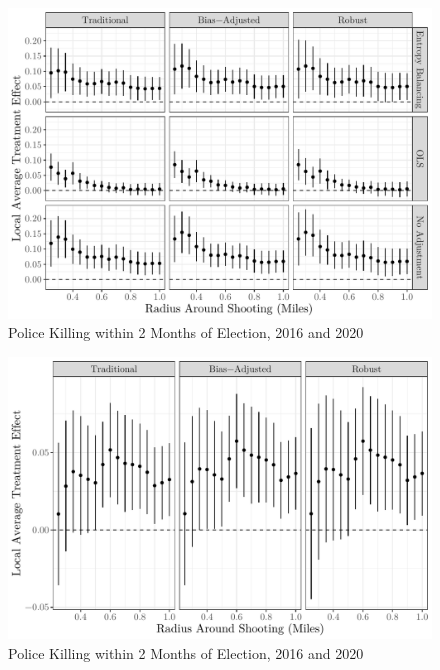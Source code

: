 \documentclass[
  12pt,
]{article}
\begin{document}
\begin{figure}[h]

{\centering \includegraphics{shoot_to_files/figure-latex/alt-proc-1} 

}

\caption{\label{fig:map}Police Killing within 2 Months of Election, 2016 and 2020}\label{fig:alt-proc}
\end{figure}

\begin{figure}[h]

{\centering \includegraphics{shoot_to_files/figure-latex/placebo-prior-1} 

}

\caption{\label{fig:map}Police Killing within 2 Months of Election, 2016 and 2020}\label{fig:placebo-prior}
\end{figure}
\end{document}
